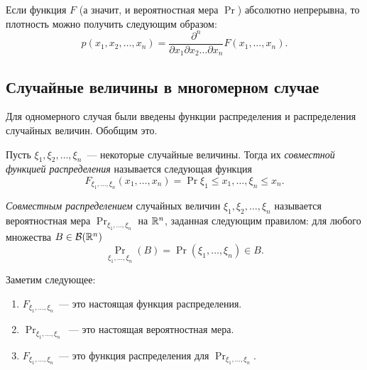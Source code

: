 Если функция \(F\) (а значит, и вероятностная мера \(\Pr\)) абсолютно непрерывна, то плотность можно получить следующим образом:
\[
p(x_1, x_2, \dots, x_n) = \frac{\partial^n}{\partial x_1 \partial x_2 \dots \partial x_n} F(x_1, \dots, x_n).
\]
\subsection{Случайные величины в многомерном случае}
Для одномерного случая были введены функции распределения и распределения случайных величин. Обобщим это.
\begin{definition}
	Пусть \(\xi_1, \xi_2, \dots, \xi_n\)~--- некоторые случайные величины. Тогда их \emph{совместной функцией распределения} называется следующая функция
	\[
	F_{\xi_1, \dots, \xi_n}(x_1, \dots, x_n) = \Pr{\xi_1 \leq x_1, \dots, \xi_n \leq x_n}.
	\]
\end{definition}
\begin{definition}
	\emph{Совместным распределением} случайных величин \(\xi_1, \xi_2, \dots, \xi_n\) называется вероятностная мера \(\Pr_{\xi_1, \dots, \xi_n}\) на \(\mathbb{R}^{n}\), заданная следующим правилом: для любого множества \(B \in \mathcal{B}(\mathbb{R}^{n})\)
	\[
	\Pr_{\xi_1, \dots, \xi_n}(B) = \Pr{(\xi_1, \dots, \xi_n) \in B}.
	\]
\end{definition}
Заметим следующее:
\begin{enumerate}
	\item \(F_{\xi_1, \dots, \xi_n}\)~--- это настоящая функция распределения.
	\item \(\Pr_{\xi_1, \dots, \xi_n}\)~--- это настоящая вероятностная мера.
	\item \(F_{\xi_1, \dots, \xi_n}\)~--- это функция распределения для \(\Pr_{\xi_1, \dots, \xi_n}\).
\end{enumerate}

